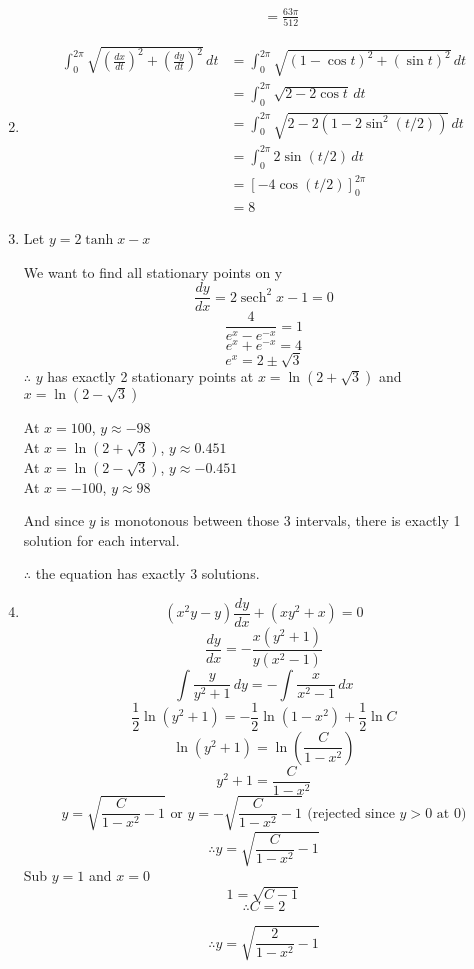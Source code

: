 \documentclass[12pt]{article}
\DeclareMathOperator{\sech}{sech}
\theoremstyle{definition}
\begin{document}
\begin{enumerate}
\begin{enumerate}
\begin{align*}
                            &= \frac{63\pi}{512}
                      \end{align*}
              \end{enumerate}
  \item \begin{align*}
          \int_0^{2\pi}\sqrt{\left(\frac{dx}{dt}\right)^2+\left(\frac{dy}{dt}\right)^2}\,dt &= \int_0^{2\pi}\sqrt{(1-\cos t)^2+(\sin t)^2}\,dt \\
            &= \int_0^{2\pi}\sqrt{2-2\cos t}\,dt \\
            &= \int_0^{2\pi}\sqrt{2-2(1-2\sin^2(t/2))}\,dt \\
            &= \int_0^{2\pi} 2\sin(t/2)\,dt \\
            &= [-4\cos(t/2)]_0^{2\pi} \\
            &= 8
        \end{align*}
  \item Let $y = 2\tanh x - x$
  
        We want to find all stationary points on y
        \[\frac{dy}{dx} = 2\sech ^2 x-1 = 0\]
        \[\frac{4}{e^x-e^{-x}}=1\]
        \[e^x+e^{-x}=4\]
        \[e^x = 2\pm \sqrt{3}\]
        $\therefore$ $y$ has exactly 2 stationary points at $x=\ln(2+\sqrt{3})$ and $x=\ln(2-\sqrt{3})$
        
        At $x=100$, $y\approx -98$ \\
        At $x=\ln(2+\sqrt{3})$, $y\approx 0.451$ \\
        At $x=\ln(2-\sqrt{3})$, $y\approx -0.451$ \\
        At $x=-100$, $y\approx 98$
        
        And since $y$ is monotonous between those 3 intervals, there is exactly 1 solution for each interval.
        
        $\therefore$ the equation has exactly 3 solutions.
  \item \[(x^2y-y)\frac{dy}{dx}+(xy^2+x)=0\]
        \[\frac{dy}{dx} = -\frac{x(y^2+1)}{y(x^2-1)}\]
        \[\int \frac{y}{y^2+1}\,dy = -\int \frac{x}{x^2-1}\,dx\]
        \[\frac{1}{2}\ln(y^2+1) = -\frac{1}{2}\ln(1-x^2) + \frac{1}{2}\ln C\]
        \[\ln(y^2+1) = \ln\left(\frac{C}{1-x^2}\right)\]
        \[y^2+1 = \frac{C}{1-x^2}\]
        \[y = \sqrt{\frac{C}{1-x^2} - 1} \text{ or } y = -\sqrt{\frac{C}{1-x^2} - 1} \text{ (rejected since $y>0$ at 0)}\]
        \[\therefore y = \sqrt{\frac{C}{1-x^2} - 1}\]
        Sub $y=1$ and $x=0$
        \[1 = \sqrt{C - 1}\]
        \[\therefore C=2\]
        
        \[\therefore y = \sqrt{\frac{2}{1-x^2} - 1}\]
        
\end{enumerate}
\end{document}
